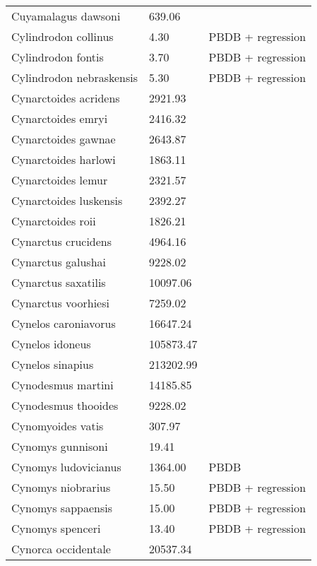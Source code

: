 \begin{longtable}{p{} p{} p{}}
    Cuyamalagus dawsoni & 639.06 & \cite{Tomiya2013} \\ 
    Cylindrodon collinus & 4.30 & PBDB + regression \\ 
    Cylindrodon fontis & 3.70 & PBDB + regression \\ 
    Cylindrodon nebraskensis & 5.30 & PBDB + regression \\ 
    Cynarctoides acridens & 2921.93 & \cite{Tomiya2013} \\ 
    Cynarctoides emryi & 2416.32 & \cite{Tomiya2013} \\ 
    Cynarctoides gawnae & 2643.87 & \cite{Tomiya2013} \\ 
    Cynarctoides harlowi & 1863.11 & \cite{Tomiya2013} \\ 
    Cynarctoides lemur & 2321.57 & \cite{Tomiya2013} \\ 
    Cynarctoides luskensis & 2392.27 & \cite{Tomiya2013} \\ 
    Cynarctoides roii & 1826.21 & \cite{Tomiya2013} \\ 
    Cynarctus crucidens & 4964.16 & \cite{Tomiya2013} \\ 
    Cynarctus galushai & 9228.02 & \cite{Tomiya2013} \\ 
    Cynarctus saxatilis & 10097.06 & \cite{Tomiya2013} \\ 
    Cynarctus voorhiesi & 7259.02 & \cite{Tomiya2013} \\ 
    Cynelos caroniavorus & 16647.24 & \cite{Tomiya2013} \\ 
    Cynelos idoneus & 105873.47 & \cite{Tomiya2013} \\ 
    Cynelos sinapius & 213202.99 & \cite{Tomiya2013} \\ 
    Cynodesmus martini & 14185.85 & \cite{Tomiya2013} \\ 
    Cynodesmus thooides & 9228.02 & \cite{Tomiya2013} \\ 
    Cynomyoides vatis & 307.97 & \cite{Tomiya2013} \\ 
    Cynomys gunnisoni & 19.41 & \cite{Smith2004} \\ 
    Cynomys ludovicianus & 1364.00 & PBDB \\ 
    Cynomys niobrarius & 15.50 & PBDB + regression \\ 
    Cynomys sappaensis & 15.00 & PBDB + regression \\ 
    Cynomys spenceri & 13.40 & PBDB + regression \\ 
    Cynorca occidentale & 20537.34 & \cite{Tomiya2013} \\ 

\end{longtable}
